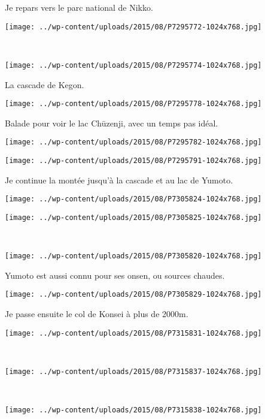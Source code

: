  Je repars vers le parc national de Nikko.
\begin{center} \texttt{[image: ../wp-content/uploads/2015/08/P7295772-1024x768.jpg]} \end{center}
~
\begin{center} \texttt{[image: ../wp-content/uploads/2015/08/P7295774-1024x768.jpg]} \end{center}
\vspace{-\topsep}
\pagebreak

 La cascade de Kegon.
\begin{center} \texttt{[image: ../wp-content/uploads/2015/08/P7295778-1024x768.jpg]} \end{center}

 Balade pour voir le lac Chūzenji, avec un temps pas idéal. 
\begin{center} \texttt{[image: ../wp-content/uploads/2015/08/P7295782-1024x768.jpg]} \end{center}
\begin{center} \texttt{[image: ../wp-content/uploads/2015/08/P7295791-1024x768.jpg]} \end{center}

 Je continue la montée jusqu'à la cascade et au lac de Yumoto. 
\begin{center} \texttt{[image: ../wp-content/uploads/2015/08/P7305824-1024x768.jpg]} \end{center}
\begin{center} \texttt{[image: ../wp-content/uploads/2015/08/P7305825-1024x768.jpg]} \end{center}
~
\begin{center} \texttt{[image: ../wp-content/uploads/2015/08/P7305820-1024x768.jpg]} \end{center}
\vspace{-\topsep}
\pagebreak

 Yumoto est aussi connu pour ses onsen, ou sources chaudes.
\begin{center} \texttt{[image: ../wp-content/uploads/2015/08/P7305829-1024x768.jpg]} \end{center}

 Je passe ensuite le col de Konsei à plus de 2000m.
\begin{center} \texttt{[image: ../wp-content/uploads/2015/08/P7315831-1024x768.jpg]} \end{center}
\vspace{-\topsep}
\pagebreak
~
\begin{center} \texttt{[image: ../wp-content/uploads/2015/08/P7315837-1024x768.jpg]} \end{center}
~
\begin{center} \texttt{[image: ../wp-content/uploads/2015/08/P7315838-1024x768.jpg]} \end{center}
\vspace{-\topsep}
\pagebreak

